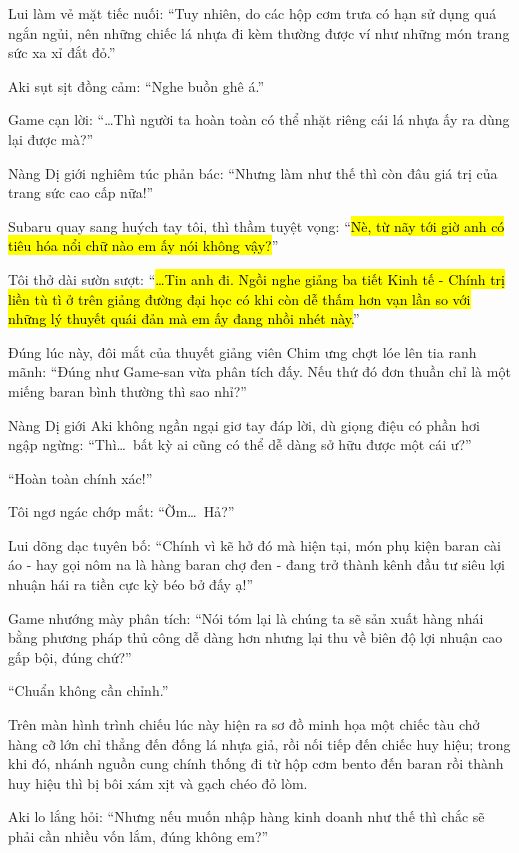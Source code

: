 \documentclass[../main.tex]{subfiles}
\begin{document}
Lui làm vẻ mặt tiếc nuối: ``Tuy nhiên, do các hộp cơm trưa có hạn sử dụng quá ngắn ngủi, nên những chiếc lá nhựa đi kèm thường được ví như những món trang sức xa xỉ đắt đỏ.''

Aki sụt sịt đồng cảm: ``Nghe buồn ghê á.''

Game cạn lời: ``\dots Thì người ta hoàn toàn có thể nhặt riêng cái lá nhựa ấy ra dùng lại được mà?''

Nàng Dị giới nghiêm túc phản bác: ``Nhưng làm như thế thì còn đâu giá trị của trang sức cao cấp nữa!''

Subaru quay sang huých tay tôi, thì thầm tuyệt vọng: ``\hl{Nè, từ nãy tới giờ anh có tiêu hóa nổi chữ nào em ấy nói không vậy?}''

Tôi thở dài sườn sượt: ``\hl{\dots Tin anh đi. Ngồi nghe giảng ba tiết Kinh tế - Chính trị liền tù tì ở trên giảng đường đại học có khi còn dễ thấm hơn vạn lần so với những lý thuyết quái đản mà em ấy đang nhồi nhét này.}''

Đúng lúc này, đôi mắt của thuyết giảng viên Chim ưng chợt lóe lên tia ranh mãnh: ``Đúng như Game-san vừa phân tích đấy. Nếu thứ đó đơn thuần chỉ là một miếng baran bình thường thì sao nhỉ?''

Nàng Dị giới Aki không ngần ngại giơ tay đáp lời, dù giọng điệu có phần hơi ngập ngừng: ``Thì\dots\ bất kỳ ai cũng có thể dễ dàng sở hữu được một cái ư?''

``Hoàn toàn chính xác!''

Tôi ngơ ngác chớp mắt: ``Ờm\dots\ Hả?''

Lui dõng dạc tuyên bố: ``Chính vì kẽ hở đó mà hiện tại, món phụ kiện baran cài áo - hay gọi nôm na là hàng baran chợ đen - đang trở thành kênh đầu tư siêu lợi nhuận hái ra tiền cực kỳ béo bở đấy ạ!''

Game nhướng mày phân tích: ``Nói tóm lại là chúng ta sẽ sản xuất hàng nhái bằng phương pháp thủ công dễ dàng hơn nhưng lại thu về biên độ lợi nhuận cao gấp bội, đúng chứ?''

``Chuẩn không cần chỉnh.''

Trên màn hình trình chiếu lúc này hiện ra sơ đồ minh họa một chiếc tàu chở hàng cỡ lớn chỉ thẳng đến đống lá nhựa giả, rồi nối tiếp đến chiếc huy hiệu; trong khi đó, nhánh nguồn cung chính thống đi từ hộp cơm bento đến baran rồi thành huy hiệu thì bị bôi xám xịt và gạch chéo đỏ lòm.


Aki lo lắng hỏi: ``Nhưng nếu muốn nhập hàng kinh doanh như thế thì chắc sẽ phải cần nhiều vốn lắm, đúng không em?''
\end{document}
